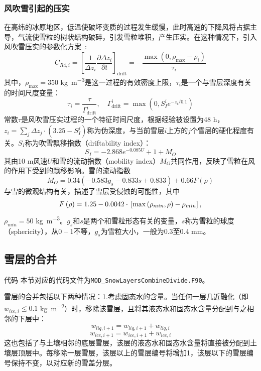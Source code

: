 \subsubsection{风吹雪引起的压实}
在高纬的冰原地区，低温使破坏变质的过程发生缓慢，此时高速的下降风将占据主导，气流使雪粒的树状结构破碎，引发雪粒堆积，产生压实。在这种情况下，引入风吹雪压实的参数化方案~\citep{Vionnet2012}:
\begin{equation}
    C_{R4,i}=\left[\frac{1}{\Delta z_i}\frac{\partial \Delta z_i}{\partial t}\right]_{\text{drift}}=-\frac{\max \left(0,\rho_{\text{max}}-\rho_i\right)}{\tau_i}
\end{equation}
其中，$\rho_{\text{max}}=350$ \unit{kg.m^{-3}}是这一过程的有效密度上限，$\tau_i$是一个与雪层深度有关的时间尺度变量：
\begin{equation}
    \tau_i=\frac{\tau}{\Gamma_{\text{drift}}^i}, \quad \Gamma_{\text{drift}}^i=\max \left(0,S_I^i e^{-z_i/0.1}\right)
\end{equation}
常数$\tau$是风吹雪压实过程的一个特征时间尺度，根据经验被设置为48 \unit{h}，$z_i=\sum_j \Delta z_j \cdot \left(3.25-S_I^j\right)$称为伪深度，与当前雪层$i$上方的$j$个雪层的硬化程度有关。$S_I$称为吹雪飘移指数（driftability index）：
\begin{equation}
    S_I=-2.868 e^{-0.085 U} + 1 + M_O
\end{equation}
其由10 \unit{m}风速$U$和雪的流动指数（mobility index）$M_O$共同作用，反映了雪粒在风的作用下受到的飘移影响。雪的流动指数
\begin{equation}
    M_O=0.34\left(-0.583g_s-0.833s+0.833\right)+0.66F\left(\rho\right)
\end{equation}
与雪的微观结构有关，描述了雪层受侵蚀的可能性，其中
$$F\left(\rho\right)=1.25-0.0042 \cdot \\\left[\max \left(\rho_{min},\rho\right)-\rho_{min}\right],$$$\rho_{min}=50$ \unit{kg.m^{-3}}。$g_s$和$s$是两个和雪粒形态有关的变量，$s$称为雪粒的球度（sphericity），从0 -- 1不等，$g_s$为雪粒大小，一般为0.3至0.4 \unit{mm}。


\subsection{雪层的合并}\label{雪层的合并}
\begin{mymdframed}{代码}
本节对应的代码文件为\texttt{MOD\_SnowLayersCombineDivide.F90}。
\end{mymdframed}

雪层的合并包括以下两种情况：1.考虑固态水的含量。当任何一层几近融化（即$w_{ice,i} \leqslant 0.1$ \unit{kg.m^{-2}}）时，移除该雪层，且将其液态水和固态水含量分配到与之相邻的下层中：
\begin{equation}
    w_{liq,i+1} = w_{liq,i+1} + w_{liq,i}
\end{equation}
\begin{equation}
    w_{ice,i+1} = w_{ice,i+1} + w_{ice,i}
\end{equation}
这也包括了与土壤相邻的底层雪层，该层的液态水和固态水含量将直接被分配到土壤层顶层中。每移除一层雪层，该层以上的雪层编号将增加1，该层以下的雪层编号保持不变，以对应新的雪盖分层。

